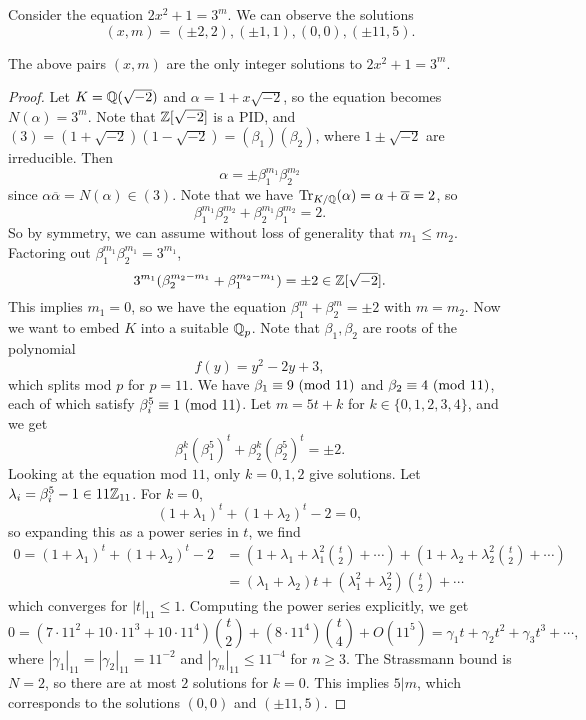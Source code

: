 \begin{example}
  Consider the equation $2x^2 + 1 = 3^m$.
  We can observe the solutions
  \[
    (x, m) = (\pm 2, 2), (\pm 1, 1), (0, 0), (\pm 11, 5).
  \]
\end{example}

\begin{theorem}
  The above pairs $(x, m)$ are the only integer
  solutions to $2x^2 + 1 = 3^m$.
\end{theorem}

\begin{proof}
  Let $K = \mathbb{Q}(\sqrt{-2})$ and $\alpha = 1 + x \sqrt{-2}$,
  so the equation becomes $N(\alpha) = 3^m$.
  Note that $\mathbb{Z}[\sqrt{-2}]$ is a PID, and
  $(3) = (1 + \sqrt{-2})(1 - \sqrt{-2}) = (\beta_1)(\beta_2)$, where
  $1 \pm \sqrt{-2}$ are irreducible. Then
  \[
    \alpha = \pm \beta_1^{m_1} \beta_2^{m_2}
  \]
  since $\alpha \overline{\alpha} = N(\alpha) \in (3)$.
  Note that we have
  $\operatorname{Tr}_{K / \mathbb{Q}}(\alpha) = \alpha + \overline{\alpha} = 2$,
  so
  \[\beta_1^{m_1} \beta_2^{m_2} + \beta_2^{m_1} \beta_1^{m_2} = 2.\]
  So by symmetry, we can assume without loss of generality that
  $m_1 \le m_2$. Factoring out
  $\beta_1^{m_1} \beta_2^{m_1} = 3^{m_1}$,
  \[
    3^{m_1} (\beta_2^{m_2 - m_1} + \beta_1^{m_2 - m_1}) = \pm 2 \in \mathbb{Z}[\sqrt{-2}].
  \]
  This implies $m_1 = 0$, so
  we have the equation $\beta_1^m + \beta_2^m = \pm 2$ with $m = m_2$. Now we want to embed
  $K$ into a suitable $\mathbb{Q}_p$. Note
  that $\beta_1, \beta_2$ are roots of the
  polynomial
  \[
    f(y) = y^2 - 2y + 3,
  \]
  which splits mod $p$ for $p = 11$.
  We have $\beta_1 \equiv 9 \ (\mathrm{mod}\ 11)$ and
  $\beta_2 \equiv 4 \ (\mathrm{mod}\ 11)$, each of which
  satisfy
  $\beta_i^5 \equiv 1 \ (\mathrm{mod}\ 11)$.
  Let $m = 5t + k$ for $k \in \{0, 1, 2, 3, 4\}$,
  and we get
  \[
    \beta_1^k (\beta_1^5)^t + \beta_2^k (\beta_2^5)^t = \pm 2.
  \]
  Looking at the equation mod $11$, only
  $k = 0, 1, 2$ give solutions. Let $\lambda_i = \beta_i^5 - 1 \in 11\mathbb{Z}_{11}$.
  For $k = 0$,
  \[
    (1 + \lambda_1)^t + (1 + \lambda_2)^t - 2 = 0,
  \]
  so expanding this as a power series in $t$,
  we find
  \begin{align*}
    0 = (1 + \lambda_1)^t + (1 + \lambda_2)^t - 2
    &= \left(1 + \lambda_1 + \lambda_1^2 \binom{t}{2} + \cdots\right)
    + \left(1 + \lambda_2 + \lambda_2^2 \binom{t}{2} + \cdots\right) \\
    &= (\lambda_1 + \lambda_2)t + (\lambda_1^2 + \lambda_2^2) \binom{t}{2} + \cdots
  \end{align*}
  which converges for $|t|_{11} \le 1$. Computing
  the power series explicitly, we get
  \[
    0 = (7 \cdot 11^2 + 10 \cdot 11^3 + 10 \cdot 11^4) \binom{t}{2}
    + (8 \cdot 11^4) \binom{t}{4} + O(11^5)
    = \gamma_1 t + \gamma_2 t^2 + \gamma_3 t^3 + \cdots,
  \]
  where $|\gamma_1|_{11} = |\gamma_2|_{11} = 11^{-2}$
  and $|\gamma_n|_{11} \le 11^{-4}$ for $n \ge 3$.
  The Strassmann bound is $N = 2$, so there are
  at most $2$ solutions for $k = 0$.
  This implies $5 | m$,
  which corresponds to the solutions
  $(0, 0)$ and $(\pm 11, 5)$.


\end{proof}

